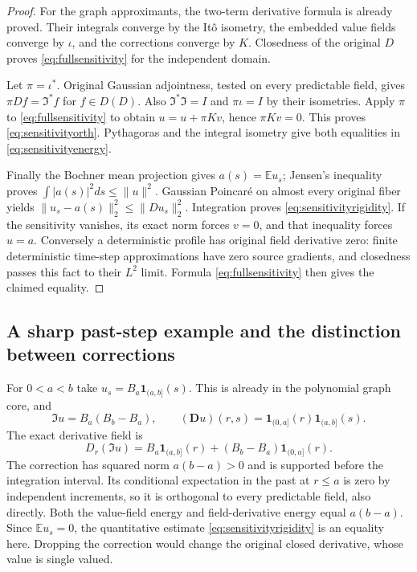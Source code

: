 \documentclass[11pt]{article}
\newcommand{\E}{\mathbb E}
\begin{document}
\begin{proof}
For the graph approximants, the two-term derivative formula is
already proved. Their integrals converge by the It\^o isometry,
the embedded value fields converge by $\iota$, and the corrections
converge by $K$. Closedness of the original $D$ proves
\eqref{eq:fullsensitivity} for the independent domain.

Let $\pi=\iota^*$. Original Gaussian adjointness, tested on every
predictable field, gives $\pi Df=\mathfrak I^*f$ for $f\in D(D)$.
Also $\mathfrak I^*\mathfrak I=I$ and $\pi\iota=I$ by their
isometries. Apply $\pi$ to \eqref{eq:fullsensitivity} to obtain
$u=u+\pi Kv$, hence $\pi Kv=0$. This proves
\eqref{eq:sensitivityorth}. Pythagoras and the integral isometry
give both equalities in \eqref{eq:sensitivityenergy}.

Finally the Bochner mean projection gives $a(s)=\E u_s$;
Jensen's inequality proves $\int|a(s)|^2ds\leq\|u\|^2$.
Gaussian Poincar\'e on almost every original fiber yields
$\|u_s-a(s)\|_2^2\leq\|Du_s\|_2^2$.
Integration proves \eqref{eq:sensitivityrigidity}.
If the sensitivity vanishes, its exact norm forces $v=0$,
and that inequality forces $u=a$. Conversely a deterministic
profile has original field derivative zero: finite deterministic
time-step approximations have zero source gradients, and closedness
passes this fact to their $L^2$ limit. Formula
\eqref{eq:fullsensitivity} then gives the claimed equality.
\end{proof}

\subsection*{A sharp past-step example and the distinction between corrections}
For $0<a<b$ take $u_s=B_a\mathbf1_{(a,b]}(s)$. This is already
in the polynomial graph core, and
\[
 \mathfrak Iu=B_a(B_b-B_a),\qquad
 (\mathbf Du)(r,s)=\mathbf1_{(0,a]}(r)\mathbf1_{(a,b]}(s).
\]
The exact derivative field is
\[
 D_r(\mathfrak Iu)=B_a\mathbf1_{(a,b]}(r)
                   +(B_b-B_a)\mathbf1_{(0,a]}(r).
\]
The correction has squared norm $a(b-a)>0$ and is supported before
the integration interval. Its conditional expectation in the past
at $r\leq a$ is zero by independent increments, so it is orthogonal
to every predictable field, also directly. Both the value-field
energy and field-derivative energy equal $a(b-a)$.
Since $\E u_s=0$, the quantitative estimate
\eqref{eq:sensitivityrigidity} is an equality here. Dropping the
correction would change the original closed derivative, whose value
is single valued.
\end{document}
